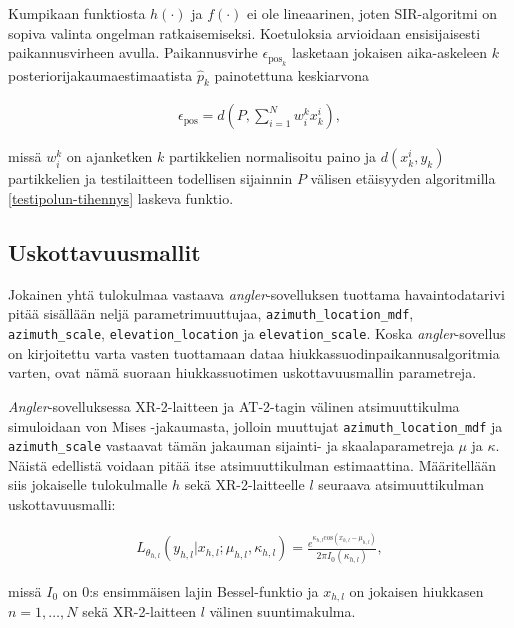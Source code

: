 \documentclass[
  12pt,
  a4paper, twoside]{book}
\begin{document}
Kumpikaan funktiosta \(h(\cdot)\) ja \(f(\cdot)\) ei ole lineaarinen, joten SIR-algoritmi on sopiva valinta ongelman ratkaisemiseksi. Koetuloksia arvioidaan ensisijaisesti paikannusvirheen avulla. Paikannusvirhe \(\epsilon_{\text{pos}_k}\) lasketaan jokaisen aika-askeleen \(k\) posteriorijakaumaestimaatista \(\hat{p}_k\) painotettuna keskiarvona

\begin{align}
\epsilon_{\text{pos}} = d\left( P, \sum_{i=1}^Nw^k_ix^i_k \right),
\end{align}

\noindent missä \(w_i^k\) on ajanketken \(k\) partikkelien normalisoitu paino ja \(d(x^i_k,y_k)\) partikkelien ja testilaitteen todellisen sijainnin \(P\) välisen etäisyyden algoritmilla \ref{testipolun-tihennys} laskeva funktio.

\hypertarget{uskottavuusmallit}{%
\subsection{Uskottavuusmallit}\label{uskottavuusmallit}}

Jokainen yhtä tulokulmaa vastaava \emph{angler}-sovelluksen tuottama havaintodatarivi pitää sisällään neljä parametrimuuttujaa, \texttt{azimuth\_location\_mdf}, \texttt{azimuth\_scale}, \texttt{elevation\_location} ja \texttt{elevation\_scale}. Koska \emph{angler}-sovellus on kirjoitettu varta vasten tuottamaan dataa hiukkassuodinpaikannusalgoritmia varten, ovat nämä suoraan hiukkassuotimen uskottavuusmallin parametreja.

\emph{Angler}-sovelluksessa XR-2-laitteen ja AT-2-tagin välinen atsimuuttikulma simuloidaan von Mises -jakaumasta, jolloin muuttujat \texttt{azimuth\_location\_mdf} ja \texttt{azimuth\_scale} vastaavat tämän jakauman sijainti- ja skaalaparametreja \(\mu\) ja \(\kappa\). Näistä edellistä voidaan pitää itse atsimuuttikulman estimaattina. Määritellään siis jokaiselle tulokulmalle \(h\) sekä XR-2-laitteelle \(l\) seuraava atsimuuttikulman uskottavuusmalli:

\begin{align}\label{atsimuutti-uskottavuusmalli}
L_{\theta_{h,l}}(y_{h,l}|x_{h,l}; \mu_{h,l}, \kappa_{h,l})=\frac{e^{\kappa_{h,l} \text{cos}(x_{h,l}-\mu_{h,l})}}{2 \pi I_0(\kappa_{h,l})},
\end{align}

\noindent missä \(I_0\) on 0:s ensimmäisen lajin Bessel-funktio ja \(x_{h,l}\) on jokaisen hiukkasen \(n=1,\ldots,N\) sekä XR-2-laitteen \(l\) välinen suuntimakulma.
\end{document}
